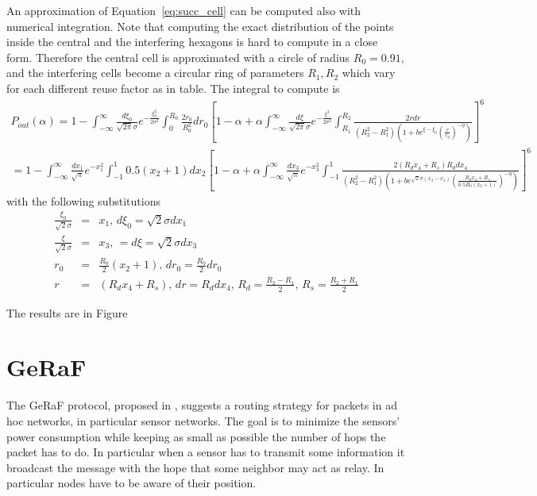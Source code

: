 \documentclass[10pt]{article}
\begin{document}
An approximation of Equation~\eqref{eq:succ_cell} can be computed also with numerical integration. Note that computing the exact distribution of the points inside the central and the interfering hexagons is hard to compute in a close form. Therefore the central cell is approximated with a circle of radius $R_0 = 0.91$, and the interfering cells become a circular ring of parameters $R_1, R_2$ which vary for each different reuse factor as in table. 
The integral to compute is 
\begin{eqnarray}
P_{out}(\alpha)  =   1 - \int_{-\infty}^{\infty} \frac{d\xi_0}{\sqrt{2\pi}\sigma} e^{-\frac{\xi_0^2}{2\sigma^2}} \int_0^{R_0} \frac{2 r_0}{R_0^2} dr_0 \left[
  1 - \alpha + \alpha \int_{-\infty}^{\infty} 
  \frac{d\xi}{\sqrt{2\pi}\sigma} 
  e^{-\frac{\xi^2}{2\sigma^2}} 
  \int_{R_1}^{R_2} 
  \frac{2r dr}{(R_2^2-R_1^2)\left(1 + b e^{\xi - \xi_0} \left( \frac{r}{r_0} \right)^{-\eta}\right)}
  \right]^{6}
  \\
   =  1 - \int_{-\infty}^{\infty} \frac{dx_1}{\sqrt{\pi}} e^{-x_1^2} \int_{-1}^{1} 0.5(x_2+1) dx_2 \left[
  1 - \alpha + \alpha \int_{-\infty}^{\infty} 
  \frac{dx_3}{\sqrt{\pi}} 
  e^{-x_3^2} 
  \int_{-1}^{1} 
  \frac{2(R_dx_4 + R_s) R_d dx_4}{(R_2^2-R_1^2)\left(1 + b e^{\sqrt{2}\sigma(x_3 - x_1)} 
  \left( \frac{R_dx_4 + R_s}{0.5R_0(x_2+1)} \right)^{-\eta}\right)}
  \right]^{6}
\end{eqnarray}
with the following substitutions
\begin{eqnarray*}
  \frac{\xi_0}{\sqrt{2}\sigma} &=& x_1, \, d\xi_0 = \sqrt{2}\sigma dx_1 \\ 
  \frac{\xi}{\sqrt{2}\sigma} &=& x_3, \, = d\xi = \sqrt{2}\sigma dx_3  \\
  r_0 &=& \frac{R_0}{2}(x_2 + 1), \, dr_0 = \frac{R_0}{2} dr_0\\
  r &=& (R_d x_4 + R_s), \, dr = R_d dx_4, \, R_d = \frac{R_2 - R_1}{2}, \, R_s = \frac{R_2 + R_1}{2}
\end{eqnarray*}

The results are in Figure

\FloatBarrier

\section*{GeRaF}
The GeRaF protocol, proposed in \cite{tmc}, suggests a routing strategy for packets in ad hoc networks, in particular sensor networks. The goal is to minimize the sensors' power consumption while keeping as small as possible the number of hops the packet has to do. In particular when a sensor has to transmit some information it broadcast the message with the hope that some neighbor may act as relay. In particular nodes have to be aware of their position. 
\end{document}
